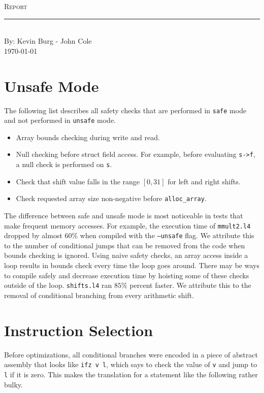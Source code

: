 \documentclass[aps,letterpaper,11pt]{revtex4}
\newcommand{\labtitle}{Report}
\newcommand{\authorname}{Kevin Burg - John Cole}
\begin{document}

\begin{titlepage}
\begin{center}
{\Large \textsc{\labtitle} \\ \vspace{4pt}} 
\rule[13pt]{\textwidth}{1pt} \\ \vspace{150pt}
{\large By: \authorname \\ \vspace{10pt}
\today}
\end{center}
\end{titlepage}


\section{Unsafe Mode}

The following list describes all safety checks that are performed in \texttt{safe} mode and not performed in
\texttt{unsafe} mode.

\begin{itemize}
\item Array bounds checking during write and read.
\item Null checking before struct field access. For example, before evaluating \texttt{s->f}, a null check
is performed on \texttt{s}.
\item Check that shift value falls in the range $[0, 31]$ for left and right shifts.
\item Check requested array size non-negative before \texttt{alloc\_array}.
\end{itemize}

The difference between safe and unsafe mode is most noticeable in tests that make frequent memory accesses.
For example, the execution time of \texttt{mmult2.l4} dropped by almost $60\%$ when compiled with the
\texttt{--unsafe} flag. We attribute this to the number of conditional jumps that can be removed from the
code when bounds checking is ignored. Using naive safety checks, an array access inside a loop results in
bounds check every time the loop goes around. There may be ways to compile safely and decrease execution
time by hoisting some of these checks outside of the loop. \texttt{shifts.l4} ran $85\%$ percent faster.
We attribute this to the removal of conditional branching from every arithmetic shift.

\section{Instruction Selection}
Before optimizations, all conditional branches were encoded in a piece of abstract assembly that looks like
\texttt{ifz v l}, which says to check the value of \texttt{v} and jump to \texttt{l} if it is zero. This makes
the translation for a statement like the following rather bulky.
\end{document}
